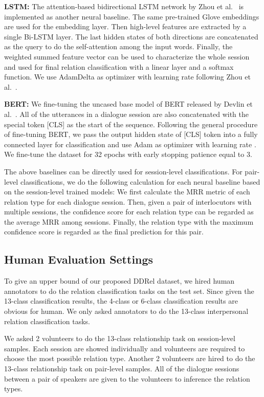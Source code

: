 \documentclass[letterpaper]{article} \usepackage{aaai21}  \usepackage{times}  \usepackage{helvet} \usepackage{courier}  \usepackage[hyphens]{url}  \usepackage{graphicx} \usepackage{xcolor}
\begin{document}
\textbf{LSTM:}
The attention-based bidirectional LSTM network by Zhou et al.~ 
is implemented as another neural baseline. The same pre-trained Glove embeddings are 
used for the embedding layer. Then high-level features are extracted by a single 
Bi-LSTM layer. The last hidden states of both directions are concatenated as the 
query to do the self-attention among the input words. Finally, the weighted summed 
feature vector can be used to characterize the whole session and used for final relation 
classification with a linear layer and a softmax function. We use AdamDelta as optimizer with
learning rate  following Zhou et al.~.

\textbf{BERT:}
We fine-tuning the uncased base model of BERT released by 
Devlin et al.~. 
All of the utterances in a dialogue session 
are also concatenated with the special token [CLS] as the start of the sequence.
Following the general procedure of fine-tuning BERT, we pass the output hidden state of 
[CLS] token into a fully connected layer for classification and use Adam as optimizer
with learning rate . We fine-tune the dataset for 32 epochs with early stopping
patience equal to 3.

The above baselines can be directly used for session-level classifications. For pair-level classifications, we do the following calculation for each neural baseline based on the session-level trained models: We first calculate the MRR metric of each relation type for each dialogue session. Then, given a pair of interlocutors with multiple sessions, the confidence score for each relation type can be regarded as the average MRR among sessions. Finally, the relation type with the maximum confidence score is regarded as the final prediction for this pair. 




\subsection{Human Evaluation Settings}

To give an upper bound of our proposed DDRel dataset, we hired human annotators to do the relation classification tasks on the test set. Since given the 13-class classification results, the 4-class or 6-class classification results are obvious for human. We only asked annotators to do the 13-class interpersonal relation classification tasks.

We asked 2 volunteers to do the 13-class relationship task on session-level samples.  Each session are showed individually and volunteers are required to choose the most possible relation type. 
Another 2 volunteers are hired to do the 13-class relationship task on pair-level samples. All of the dialogue sessions between a pair of speakers are given to the volunteers to inference the relation types.
\end{document}
